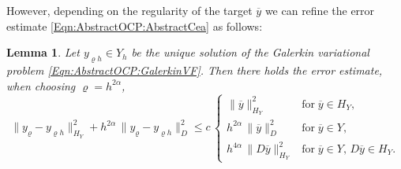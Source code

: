 \documentclass{article}
\newtheorem{lemma}{Lemma}
\numberwithin{equation}{section}
\begin{document}
However, depending on the regularity of the target $\overline{y}$ we can
refine the error estimate \eqref{Eqn:AbstractOCP:AbstractCea} as follows:

\begin{lemma}
  Let $y_{\varrho h} \in Y_h$ be the unique solution of the Galerkin
  variational problem \eqref{Eqn:AbstractOCP:GalerkinVF}. Then there
  holds the error estimate, when choosing $\varrho = h^{2\alpha}$,
  \begin{equation}\label{Eqn:AbstractOCP:Error}
    \| y_\varrho - y_{\varrho h} \|_{H_Y}^2 + h^{2\alpha} \,
    \| y_\varrho - y_{\varrho h} \|_D^2
    \leq c \, \left \{
      \begin{array}{cl}
        \| \overline{y} \|^2_{H_Y}
        & \mbox{for} \; \overline{y} \in H_Y, \\[2mm]
        h^{2\alpha} \, \| \overline{y} \|_D^2
        & \mbox{for} \; \overline{y} \in Y, \\[2mm]
        h^{4\alpha} \, \| D \overline{y} \|_{H_Y}^2
        & \mbox{for} \; \overline{y} \in Y, \, D \overline{y} \in H_Y .
      \end{array} \right.
  \end{equation}
\end{lemma}
\end{document}
